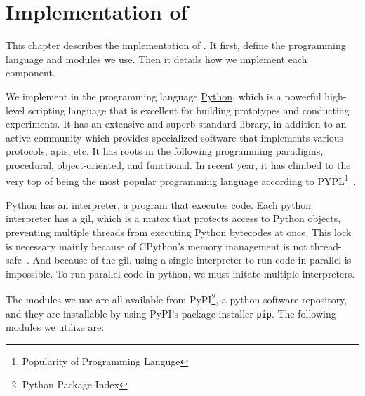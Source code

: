 
\chapter{Implementation of \project}\label{ch:implementation}\glsresetall
This chapter describes the implementation of \project. It first, define the programming language and modules we use. Then it details how we implement each component.

We implement \project in the programming language \href{https://www.python.org/}{Python}, which is a powerful high-level scripting language that is excellent for building prototypes and conducting experiments. It has an extensive and superb standard library, in addition to an active community which provides specialized software that implements various protocols, \acp{api}, etc. It has roots in the following programming paradigms, procedural, object-oriented, and functional. In recent year, it has climbed to the very top of being the most popular programming language according to PYPL\footnote{Popularity of Programming Languge}~\cite{pypl_python}.

Python has an interpreter, a program that executes code. Each python interpreter has a \ac{gil}, which is a mutex that protects access to Python objects, preventing multiple threads from executing Python bytecodes at once. This lock is necessary mainly because of CPython's memory management is not thread-safe~\cite{python_gil}. And because of the \ac{gil}, using a single interpreter to run code in parallel is impossible. To run parallel code in python, we must initate multiple interpreters.

The modules we use are all available from PyPI\footnote{Python Package Index}, a python software repository, and they are installable by using PyPI's package installer \texttt{pip}. The following modules we utilize are:

